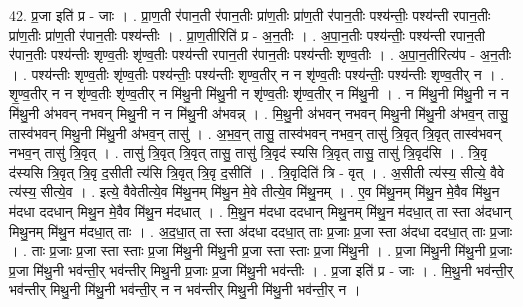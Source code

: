 \documentclass[17pt]{extarticle}
\begin{document}
42. प्र॒जा इति॑ प्र - जाः । . प्रा॒ण॒ती र॑पान॒ती र॑पान॒तीः प्रा॑ण॒तीः प्रा॑ण॒ती र॑पान॒तीः पश्य॑न्तीः॒ पश्य॑न्ती रपान॒तीः प्रा॑ण॒तीः प्रा॑ण॒ती र॑पान॒तीः पश्य॑न्तीः । . प्रा॒ण॒तीरिति॑ प्र - अ॒न॒तीः । . अ॒पा॒न॒तीः पश्य॑न्तीः॒ पश्य॑न्ती रपान॒ती र॑पान॒तीः पश्य॑न्तीः शृण्व॒तीः शृ॑ण्व॒तीः पश्य॑न्ती रपान॒ती र॑पान॒तीः पश्य॑न्तीः शृण्व॒तीः । . अ॒पा॒न॒तीरित्य॑प - अ॒न॒तीः । . पश्य॑न्तीः शृण्व॒तीः शृ॑ण्व॒तीः पश्य॑न्तीः॒ पश्य॑न्तीः शृण्व॒तीर् न न शृ॑ण्व॒तीः पश्य॑न्तीः॒ पश्य॑न्तीः शृण्व॒तीर् न । . शृ॒ण्व॒तीर् न न शृ॑ण्व॒तीः शृ॑ण्व॒तीर् न मि॑थु॒नी मि॑थु॒नी न शृ॑ण्व॒तीः शृ॑ण्व॒तीर् न मि॑थु॒नी । . न मि॑थु॒नी मि॑थु॒नी न न मि॑थु॒नी अ॑भवन् नभवन् मिथु॒नी न न मि॑थु॒नी अ॑भवन्न् । . मि॒थु॒नी अ॑भवन् नभवन् मिथु॒नी मि॑थु॒नी अ॑भव॒न् तासु॒ तास्व॑भवन् मिथु॒नी मि॑थु॒नी अ॑भव॒न् तासु॑ । . अ॒भ॒व॒न् तासु॒ तास्व॑भवन् नभव॒न् तासु॑ त्रि॒वृत् त्रि॒वृत् तास्व॑भवन् नभव॒न् तासु॑ त्रि॒वृत् । . तासु॑ त्रि॒वृत् त्रि॒वृत् तासु॒ तासु॑ त्रि॒वृद॑ स्यसि त्रि॒वृत् तासु॒ तासु॑ त्रि॒वृद॑सि । . त्रि॒वृ द॑स्यसि त्रि॒वृत् त्रि॒वृ द॒सीती त्य॑सि त्रि॒वृत् त्रि॒वृ द॒सीति॑ । . त्रि॒वृदिति॑ त्रि - वृत् । . अ॒सीती त्य॑स्य॒ सीत्ये॒ वैवे त्य॑स्य॒ सीत्ये॒व । . इत्ये॒ वैवेतीत्ये॒व मि॑थु॒नम् मि॑थु॒न मे॒वे तीत्ये॒व मि॑थु॒नम् । . ए॒व मि॑थु॒नम् मि॑थु॒न मे॒वैव मि॑थु॒न म॑दधा ददधान् मिथु॒न मे॒वैव मि॑थु॒न म॑दधात् । . मि॒थु॒न म॑दधा ददधान् मिथु॒नम् मि॑थु॒न म॑दधा॒त् ता स्ता अ॑दधान् मिथु॒नम् मि॑थु॒न म॑दधा॒त् ताः । . अ॒द॒धा॒त् ता स्ता अ॑दधा ददधा॒त् ताः प्र॒जाः प्र॒जा स्ता अ॑दधा ददधा॒त् ताः प्र॒जाः । . ताः प्र॒जाः प्र॒जा स्ता स्ताः प्र॒जा मि॑थु॒नी मि॑थु॒नी प्र॒जा स्ता स्ताः प्र॒जा मि॑थु॒नी । . प्र॒जा मि॑थु॒नी मि॑थु॒नी प्र॒जाः प्र॒जा मि॑थु॒नी भव॑न्ती॒र् भव॑न्तीर् मिथु॒नी प्र॒जाः प्र॒जा मि॑थु॒नी भव॑न्तीः । . प्र॒जा इति॑ प्र - जाः । . मि॒थु॒नी भव॑न्ती॒र् भव॑न्तीर् मिथु॒नी मि॑थु॒नी भव॑न्ती॒र् न न भव॑न्तीर् मिथु॒नी मि॑थु॒नी भव॑न्ती॒र् न । \newline
\pagebreak
{}
\end{document}
